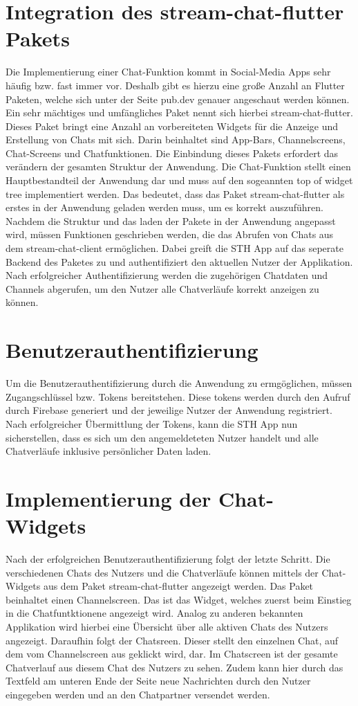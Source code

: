 \section{Integration des stream-chat-flutter Pakets}
Die Implementierung einer Chat-Funktion kommt in Social-Media Apps sehr häufig bzw. fast immer vor. Deshalb gibt es hierzu eine große Anzahl an Flutter Paketen, welche sich unter der Seite pub.dev genauer angeschaut werden können. Ein sehr mächtiges und umfängliches Paket nennt sich hierbei stream-chat-flutter. Dieses Paket bringt eine Anzahl an vorbereiteten Widgets für die Anzeige und Erstellung von Chats mit sich. Darin beinhaltet sind App-Bars, Channelscreens, Chat-Screens und Chatfunktionen. Die Einbindung dieses Pakets erfordert das verändern der gesamten Struktur der Anwendung. Die Chat-Funktion stellt einen Hauptbestandteil der Anwendung dar und muss auf den sogeannten top of widget tree implementiert werden. Das bedeutet, dass das Paket stream-chat-flutter als erstes in der Anwendung geladen werden muss, um es korrekt auszuführen. Nachdem die Struktur und das laden der Pakete in der Anwendung angepasst wird, müssen Funktionen geschrieben werden, die das Abrufen von Chats aus dem stream-chat-client ermöglichen. Dabei greift die STH App auf das seperate Backend des Paketes zu und authentifiziert den aktuellen Nutzer der Applikation. Nach erfolgreicher Authentifizierung werden die zugehörigen Chatdaten und Channels abgerufen, um den Nutzer alle Chatverläufe korrekt anzeigen zu können.

\section{Benutzerauthentifizierung}
Um die Benutzerauthentifizierung durch die Anwendung zu ermgöglichen, müssen Zugangschlüssel bzw. Tokens bereitstehen. Diese tokens werden durch den Aufruf durch Firebase generiert und der jeweilige Nutzer der Anwendung registriert. Nach erfolgreicher Übermittlung der Tokens, kann die STH App nun sicherstellen, dass es sich um den angemeldeteten Nutzer handelt und alle Chatverläufe inklusive persönlicher Daten laden. 

\section{Implementierung der Chat-Widgets}
Nach der erfolgreichen Benutzerauthentifizierung folgt der letzte Schritt. Die verschiedenen Chats des Nutzers und die Chatverläufe können mittels der Chat-Widgets aus dem Paket stream-chat-flutter angezeigt werden. Das Paket beinhaltet einen Channelscreen. Das ist das Widget, welches zuerst beim Einstieg in die Chatfuntktionene angezeigt wird. Analog zu anderen bekannten Applikation wird hierbei eine Übersicht über alle aktiven Chats des Nutzers angezeigt. Daraufhin folgt der Chatsreen. Dieser stellt den einzelnen Chat, auf dem vom Channelscreen aus geklickt wird, dar. Im Chatscreen ist der gesamte Chatverlauf aus diesem Chat des Nutzers zu sehen. Zudem kann hier durch das Textfeld am unteren Ende der Seite neue Nachrichten durch den Nutzer eingegeben werden und an den Chatpartner versendet werden.

